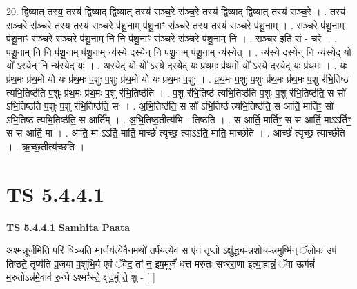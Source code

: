 \documentclass[17pt]{extarticle}
\begin{document}
20. द्वि॒ष्यात् तस्य॒ तस्य॑ द्वि॒ष्याद् द्वि॒ष्यात् तस्य॑ सञ्च॒रे स॑ञ्च॒रे तस्य॑ द्वि॒ष्याद् द्वि॒ष्यात् तस्य॑ सञ्च॒रे । . तस्य॑ सञ्च॒रे स॑ञ्च॒रे तस्य॒ तस्य॑ सञ्च॒रे प॑शू॒नाम् प॑शू॒नाꣳ स॑ञ्च॒रे तस्य॒ तस्य॑ सञ्च॒रे प॑शू॒नाम् । . स॒ञ्च॒रे प॑शू॒नाम् प॑शू॒नाꣳ स॑ञ्च॒रे स॑ञ्च॒रे प॑शू॒नाम् नि नि प॑शू॒नाꣳ स॑ञ्च॒रे स॑ञ्च॒रे प॑शू॒नाम् नि । . स॒ञ्च॒र इति॑ सं - च॒रे । . प॒शू॒नाम् नि नि प॑शू॒नाम् प॑शू॒नाम् न्य॑स्ये दस्ये॒न् नि प॑शू॒नाम् प॑शू॒नाम् न्य॑स्येत् । . न्य॑स्ये दस्ये॒न् नि न्य॑स्ये॒द् यो यो᳚ ऽस्ये॒न् नि न्य॑स्ये॒द् यः । . अ॒स्ये॒द् यो यो᳚ ऽस्ये दस्ये॒द् यः प्र॑थ॒मः प्र॑थ॒मो यो᳚ ऽस्ये दस्ये॒द् यः प्र॑थ॒मः । . यः प्र॑थ॒मः प्र॑थ॒मो यो यः प्र॑थ॒मः प॒शुः प॒शुः प्र॑थ॒मो यो यः प्र॑थ॒मः प॒शुः । . प्र॒थ॒मः प॒शुः प॒शुः प्र॑थ॒मः प्र॑थ॒मः प॒शु र॑भि॒तिष्ठ॑ त्यभि॒तिष्ठ॑ति प॒शुः प्र॑थ॒मः प्र॑थ॒मः प॒शु र॑भि॒तिष्ठ॑ति । . प॒शु र॑भि॒तिष्ठ॑ त्यभि॒तिष्ठ॑ति प॒शुः प॒शु र॑भि॒तिष्ठ॑ति॒ स सो॑ ऽभि॒तिष्ठ॑ति प॒शुः प॒शु र॑भि॒तिष्ठ॑ति॒ सः । . अ॒भि॒तिष्ठ॑ति॒ स सो॑ ऽभि॒तिष्ठ॑ त्यभि॒तिष्ठ॑ति॒ स आर्ति॒ मार्तिꣳ॒॒ सो॑ ऽभि॒तिष्ठ॑ त्यभि॒तिष्ठ॑ति॒ स आर्ति᳚म् । . अ॒भि॒तिष्ठ॒तीत्य॑भि - तिष्ठ॑ति । . स आर्ति॒ मार्तिꣳ॒॒ स स आर्ति॒ माऽऽर्तिꣳ॒॒ स स आर्ति॒ मा । . आर्ति॒ मा ऽऽर्ति॒ मार्ति॒ मार्च्छ॑ त्यृच्छ॒ त्याऽऽर्ति॒ मार्ति॒ मार्च्छ॑ति । . आर्च्छ॑ त्यृच्छ॒ त्यार्च्छ॑ति । . ऋ॒च्छ॒तीत्यृ॑च्छति । \newline
\pagebreak
{}

\section{ TS 5.4.4.1 }

\textbf{TS 5.4.4.1 } \newline
\textbf{Samhita Paata} \newline

अश्म॒न्नूर्ज॒मिति॒ परि॑ षिञ्चति मा॒र्जय॑त्ये॒वैन॒मथो॑ त॒र्पय॑त्ये॒व स ए॑नं तृ॒प्तो ऽक्षु॑द्ध्य॒-न्नशो॑च-न्न॒मुष्मि॑न् ॅलो॒क उप॑ तिष्ठते॒ तृप्य॑ति प्र॒जया॑ प॒शुभि॒र्य ए॒वं ॅवेद॒ तां न॒ इष॒मूर्जं॑ धत्त मरुतः सꣳररा॒णा इत्या॒हान्नं॒ ॅवा ऊर्गन्नं॑ म॒रुतोऽन्न॑मे॒वाव॑ रु॒न्धे ऽश्मꣳ॑स्ते॒ क्षुद॒मुं ते॒ शु - [  ] \newline
\end{document}
